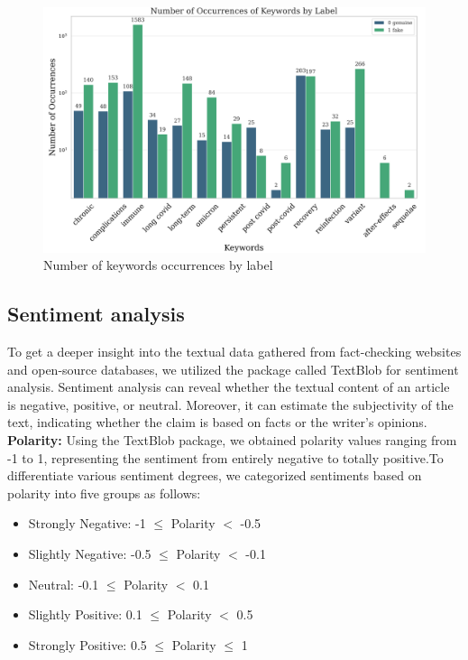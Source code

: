 \begin{figure}
    \centering
    \includegraphics[width=1\linewidth]{img/keywords_by_label.png}
    \caption{Number of keywords occurrences by label}
    \label{fig:keywords_by_label}
\end{figure}

\subsection{Sentiment analysis}
To get a deeper insight into the textual data gathered from fact-checking websites and open-source databases, we utilized the package called TextBlob \cite{b16} for sentiment analysis. Sentiment analysis can reveal whether the textual content of an article is negative, positive, or neutral. Moreover, it can estimate the subjectivity of the text, indicating whether the claim is based on facts or the writer's opinions. \\

\textbf{Polarity:}
Using the TextBlob package, we obtained polarity values ranging from -1 to 1, representing the sentiment from entirely negative to totally positive.To differentiate various sentiment degrees, we categorized sentiments based on polarity into five groups as follows:
\begin{itemize}
\item Strongly Negative: -1 $\leq$ Polarity $<$ -0.5
\item Slightly Negative: -0.5 $\leq$ Polarity $<$ -0.1
\item Neutral: -0.1 $\leq$ Polarity $<$ 0.1
\item Slightly Positive: 0.1 $\leq$ Polarity $<$ 0.5
\item Strongly Positive: 0.5 $\leq$ Polarity $\leq$ 1
\end{itemize}

